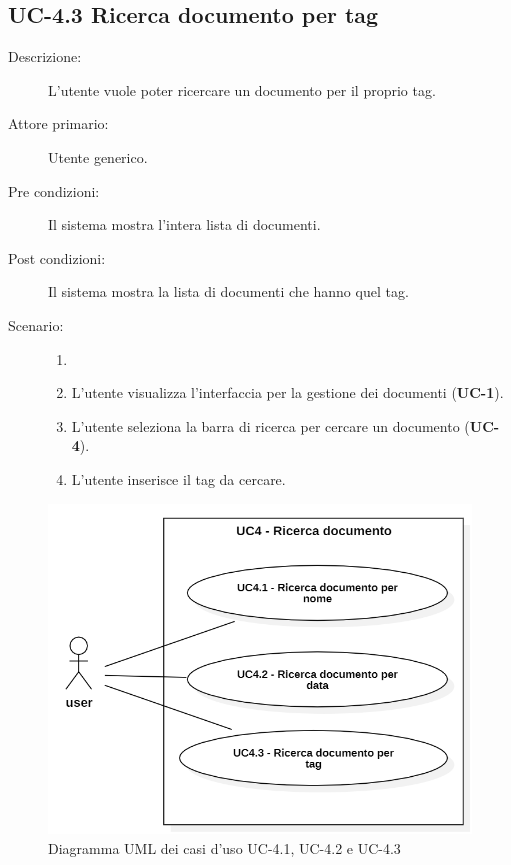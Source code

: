 \subsection{UC-4.3 Ricerca documento per tag}
\begin{description}
    \item[Descrizione:] L’utente vuole poter ricercare un documento per il proprio tag.
    \item[Attore primario:] Utente generico.
    \item[Pre condizioni:] Il sistema mostra l’intera lista di documenti.
    \item[Post condizioni:] Il sistema mostra la lista di documenti che hanno quel tag.
    \item[Scenario:] 
    \begin{enumerate}
        \item[] 
        \item L’utente visualizza l'interfaccia per la gestione dei documenti (\textbf{UC-1}).
        \item L’utente seleziona la barra di ricerca per cercare un documento (\textbf{UC-4}).
        \item L’utente inserisce il tag da cercare.
    \end{enumerate}
\end{description}

\begin{figure}[H]
    \centering
    \includegraphics[width=0.8\linewidth]{UC4.1-2-3.PNG}
    \caption{Diagramma UML dei casi d'uso UC-4.1, UC-4.2 e UC-4.3}
    \label{fig:UC4.1-2-3}
\end{figure}

